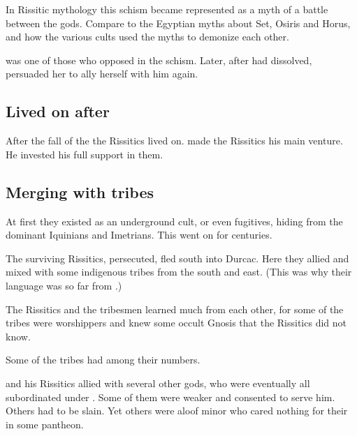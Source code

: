 In Rissitic mythology this schism became represented as a myth of a battle between the gods. 
Compare to the Egyptian myths about Set, Osiris and Horus, and how the various cults used the myths to demonize each other. 

\Nzessuacrith was one of those who opposed \Secherdamon in the schism.
Later, after \Ortaica had dissolved, \Secherdamon persuaded her to ally herself with him again. 









\subsection{Lived on after \Ortaica}
After the fall of the \bacconate{} the Rissitics lived on. 
\Secherdamon{} made the Rissitics his main venture. 
He invested his full support in them. 









\subsection{Merging with tribes}
At first they existed as an underground cult, or even fugitives, hiding from the dominant Iquinians and Imetrians. 
This went on for centuries. 

The surviving Rissitics, persecuted, fled south into Durcac. 
Here they allied and mixed with some indigenous tribes from the south and east. 
(This was why their language was so far from \Ortaican.)

The Rissitics and the tribesmen learned much from each other, for some of the tribes were \xs{} worshippers and knew some occult Gnosis that the Rissitics did not know. 

Some of the tribes had  among their numbers. 

\Secherdamon{} and his Rissitics allied with several other gods, who were eventually all subordinated under \Secherdamon. 
Some of them were weaker and consented to serve him. 
Others had to be slain. 
Yet others were aloof minor \xss{} who cared nothing for their  in some \Miithian{} pantheon.





